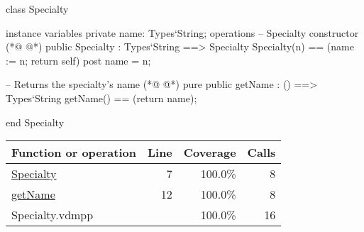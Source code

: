 \begin{vdmpp}[breaklines=true]
class Specialty

instance variables
  private name: Types`String;
operations
 -- Specialty constructor
(*@
\label{Specialty:7}
@*)
 public Specialty : Types`String ==> Specialty
  Specialty(n) == (name := n; return self)
 post name = n;
 
 -- Returns the specialty's name
(*@
\label{getName:12}
@*)
 pure public getName : () ==> Types`String
  getName() == (return name);

end Specialty
\end{vdmpp}
\bigskip
\begin{longtable}{|l|r|r|r|}
\hline
Function or operation & Line & Coverage & Calls \\
\hline
\hline
\hyperref[Specialty:7]{Specialty} & 7&100.0\% & 8 \\
\hline
\hyperref[getName:12]{getName} & 12&100.0\% & 8 \\
\hline
\hline
Specialty.vdmpp & & 100.0\% & 16 \\
\hline
\end{longtable}

